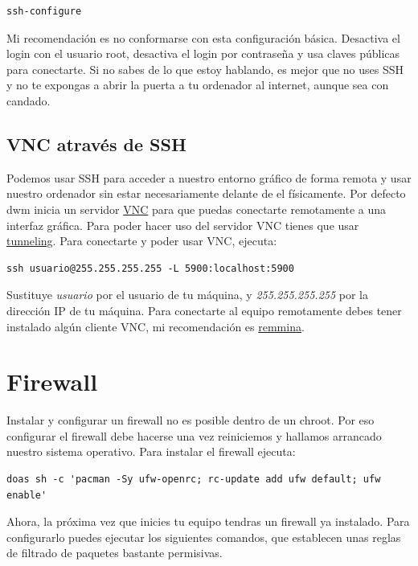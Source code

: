\documentclass[11pt]{article}
\begin{document}
\begin{verbatim}
ssh-configure
\end{verbatim}

Mi recomendación es no conformarse con esta configuración básica. Desactiva el login con el usuario root, desactiva el login por contraseña y usa claves públicas para conectarte. Si no sabes de lo que estoy hablando, es mejor que no uses SSH y no te expongas a abrir la puerta a tu ordenador al internet, aunque sea con candado.

\subsection{VNC através de SSH}

Podemos usar SSH para acceder a nuestro entorno gráfico de forma remota y usar nuestro ordenador sin estar necesariamente delante de el físicamente. Por defecto dwm inicia un servidor \href{https://en.wikipedia.org/wiki/Virtual_Network_Computing}{VNC} para que puedas conectarte remotamente a una interfaz gráfica. Para poder hacer uso del servidor VNC tienes que usar \href{https://en.wikipedia.org/wiki/Tunneling_protocol}{tunneling}. Para conectarte y poder usar VNC, ejecuta:

\begin{verbatim}
ssh usuario@255.255.255.255 -L 5900:localhost:5900
\end{verbatim}

Sustituye \textit{usuario} por el usuario de tu máquina, y \textit{255.255.255.255} por la dirección IP de tu máquina. Para conectarte al equipo remotamente debes tener instalado algún cliente VNC, mi recomendación es \href{https://github.com/FreeRDP/Remmina}{remmina}.

\section{Firewall}

Instalar y configurar un firewall no es posible dentro de un chroot. Por eso configurar el firewall debe hacerse una vez reiniciemos y hallamos arrancado nuestro sistema operativo. Para instalar el firewall ejecuta:

\begin{verbatim}
doas sh -c 'pacman -Sy ufw-openrc; rc-update add ufw default; ufw enable'
\end{verbatim}

Ahora, la próxima vez que inicies tu equipo tendras un firewall ya instalado. Para configurarlo puedes ejecutar los siguientes comandos, que establecen unas reglas de filtrado de paquetes bastante permisivas.
\end{document}
